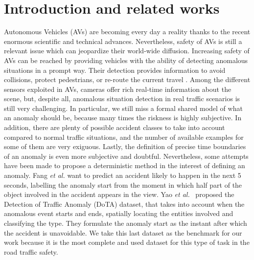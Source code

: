 \section{Introduction and related works}

Autonomous Vehicles (AVs) are becoming every day a reality thanks to the recent enormous scientific and technical advances.
Nevertheless, safety of AVs is still a relevant issue which can jeopardize their world-wide diffusion.
Increasing safety of AVs can be reached by providing vehicles with the ability of detecting anomalous situations in a prompt way.
Their detection provides information to avoid collisions, protect pedestrians, or re-route the current travel \cite{4298901}.
Among the different sensors exploited in AVs, cameras offer rich real-time information about the scene, but, despite all, anomalous situation detection in real traffic scenarios is still very challenging.
In particular, we still miss a formal shared model of what an anomaly should be, because many times the riskness is highly subjective.
In addition, there are plenty of possible accident classes to take into account compared to normal traffic situations, and the number of available examples for some of them are very exiguous.
Lastly, the definition of precise time boundaries of an anomaly is even more subjective and doubtful.
Nevertheless, some attempts have been made to propose a deterministic method in the interest of defining an anomaly.
Fang \emph{et al.} \cite{fang2019dada} want to predict an accident likely to happen in the next 5 seconds, labelling the anomaly start from the moment in which half part of the object involved in the accident appears in the view.
Yao \emph{et al.}~\cite{9712446} proposed the Detection of Traffic Anomaly (DoTA) dataset, that takes into account when the anomalous event starts and ends, spatially locating the entities involved and classifying the type.
They formulate the anomaly start as the instant after which the accident is unavoidable. %
We take this last dataset as the benchmark for our work because it is the most complete and used dataset for this type of task in the road traffic safety.

